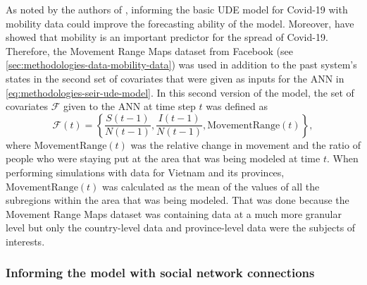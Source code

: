 As noted by the authors of \cite{dandekarMachineLearningAidedGlobal2020a}, informing the basic \gls{UDE} model for Covid-19 with mobility data could improve the forecasting ability of the model.
Moreover, \cite{changMobilityNetworkModels2021,ihmecovid-19forecastingteamModelingCOVID19Scenarios2021,liSubstantialUndocumentedInfection2020} have showed that mobility is an important predictor for the spread of Covid-19.
Therefore, the Movement Range Maps dataset from Facebook (see \autoref{sec:methodologies-data-mobility-data}) was used in addition to the past system's states in the second set of covariates that were given as inputs for the \gls{ANN} in \autoref{eq:methodologies-seir-ude-model}.
In this second version of the model, the set of covariates $\mathcal{F}$ given to the \gls{ANN} at time step $t$ was defined as
\begin{equation*}
    \mathcal{F}(t) = \left\lbrace \frac{S(t-1)}{N(t-1)}, \frac{I(t-1)}{N(t-1)}, \text{MovementRange}(t) \right\rbrace,
\end{equation*}
where $\text{MovementRange}(t)$ was the relative change in movement and the ratio of people who were staying put at the area that was being modeled at time $t$.
When performing simulations with data for Vietnam and its provinces, $\text{MovementRange}(t)$ was calculated as the mean of the values of all the subregions within the area that was being modeled.
That was done because the Movement Range Maps dataset was containing data at a much more granular level but only the country-level data and province-level data were the subjects of interests.

\subsubsection{Informing the model with social network connections}

